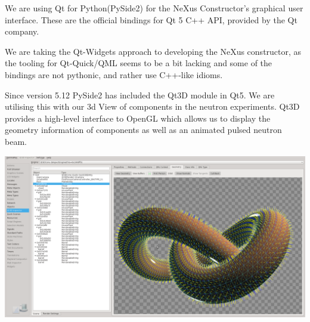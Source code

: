 \documentclass[usenames,dvipsnames]{beamer}
\begin{document}
\begin{frame}[t]
\begin{columns}[t]
\begin{column}{0.47\paperwidth}
\begin{tcolorbox}[colback=white,colframe=white,title=Qt for Python,coltitle=blue]
We are using Qt for Python(PySide2) for the NeXus Constructor's graphical user interface. These are the official bindings for Qt 5 C++ API, provided by the Qt company. 

We are taking the Qt-Widgets approach to developing the NeXus constructor, as the tooling for Qt-Quick/QML seems to be a bit lacking and some of the bindings are not pythonic, and rather use C++-like idioms. 

Since version 5.12 PySide2 has included the Qt3D module in Qt5. We are utilising this with our 3d View of components in the neutron experiments. Qt3D provides a high-level interface to OpenGL which allows us to display the geometry information of components as well as an animated pulsed neutron beam.

\includegraphics[width=\linewidth]{qt3d.png}

\end{tcolorbox}

\bigskip


\bigskip

\begin{tcolorbox}[colback=white,colframe=white,title=Conclusion,coltitle=blue]
\lipsum[2]
\end{tcolorbox}

\end{column}
\end{columns}
 
\end{frame}
\end{document}
